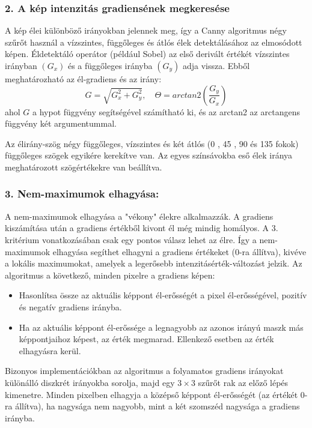 \subsubsection{2. A kép intenzitás gradiensének megkeresése}

A kép élei különböző irányokban jelennek meg, így a Canny algoritmus négy szűrőt használ a vízszintes, függőleges és átlós élek detektálásához az elmosódott képen. Éldetektáló operátor (például Sobel) az első derivált értékét vízszintes irányban $(G_x)$ és a függőleges irányba $(G_y)$ adja vissza. Ebből meghatározható az él-gradiens és az irány:
$$
G = \sqrt{G_{x}^{2}+G_{y}^{2}},
\quad
\Theta = arctan2\left(\frac{G_y}{G_x}\right)
$$
ahol $G$ a hypot függvény segítségével számítható ki, és az arctan2 az arctangens függvény két argumentummal.

Az élirány-szög négy függőleges, vízszintes és két átlós (0 , 45 , 90  és 135 fokok) függőleges szögek egyikére kerekítve van. Az egyes színsávokba eső élek iránya meghatározott szögértékekre van beállítva.

\subsubsection{3. Nem-maximumok elhagyása:}

A nem-maximumok elhagyása a "vékony" élekre alkalmazzák. A gradiens kiszámítása után a gradiens értékből kivont él még mindig homályos. A 3. kritérium vonatkozásában csak egy pontos válasz lehet az élre. Így a nem-maximumok elhagyása segíthet elhagyni a gradiens értékeket (0-ra állítva), kivéve a lokális maximumokat, amelyek a legerősebb intenzitásérték-változást jelzik. Az algoritmus a következő, minden pixelre a gradiens képen:
\begin{itemize}
\item Hasonlítsa össze az aktuális képpont él-erősségét a pixel él-erősségével, pozitív és negatív gradiens irányba.
\item Ha az aktuális képpont él-erőssége a legnagyobb az azonos irányú maszk más képpontjaihoz képest, az érték megmarad. Ellenkező esetben az érték elhagyásra kerül.
\end{itemize}

Bizonyos implementációkban az algoritmus a folyamatos gradiens irányokat különálló diszkrét irányokba sorolja, majd egy $3 \times 3$ szűrőt rak az előző lépés kimenetre. Minden pixelben elhagyja a középső képpont él-erősségét (az értékét 0-ra állítva), ha nagysága nem nagyobb, mint a két szomszéd nagysága a gradiens irányba.

